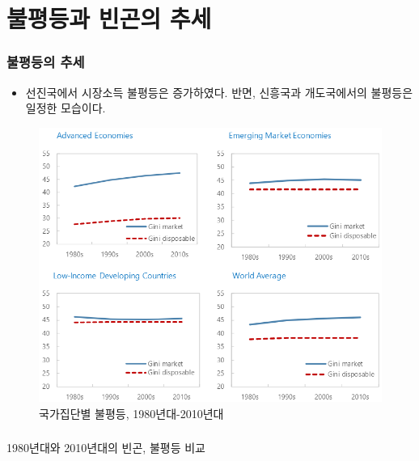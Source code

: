 \documentclass[handout, 10pt]{beamer}
\begin{document}
\section{불평등과 빈곤의 추세}
\begin{frame}[<+->]
\frametitle{불평등의 추세}
    \begin{itemize}
        \item 선진국에서 시장소득 불평등은 증가하였다. 반면, 신흥국과 개도국에서의 불평등은 일정한 모습이다.
    \end{itemize}
    \begin{figure}[htpb]
        \begin{center}
            \caption{국가집단별 불평등, 1980년대-2010년대}
            \includegraphics[scale=0.3]{pic/Inequality across Country Group.png}
        \end{center}
    \end{figure}
\end{frame}


\begin{frame}[<+->]
\frametitle{}
    \begin{table}[htbp]
        \begin{adjustbox}{width=\textwidth, totalheight=\baselineskip,keepaspectratio}
            \begin{threeparttable}
                \caption{1980년대와 2010년대의 빈곤, 불평등 비교}
                
            \end{threeparttable}
        \end{adjustbox}
    \end{table}
\end{frame}
\end{document}
